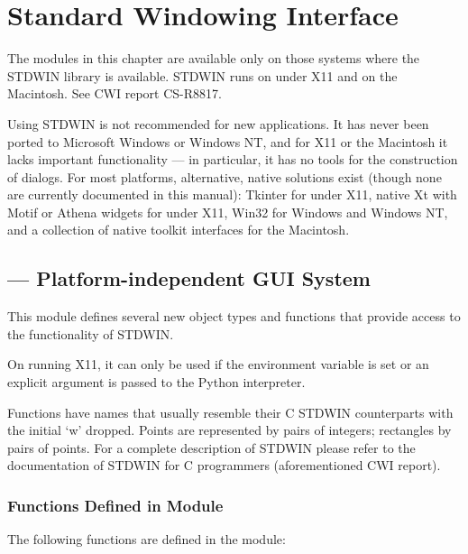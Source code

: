 \chapter{Standard Windowing Interface}

The modules in this chapter are available only on those systems where
the STDWIN library is available.  STDWIN runs on \UNIX{} under X11 and
on the Macintosh.  See CWI report CS-R8817.

 Using STDWIN is not recommended for new
applications.  It has never been ported to Microsoft Windows or
Windows NT, and for X11 or the Macintosh it lacks important
functionality --- in particular, it has no tools for the construction
of dialogs.  For most platforms, alternative, native solutions exist
(though none are currently documented in this manual): Tkinter for
\UNIX{} under X11, native Xt with Motif or Athena widgets for \UNIX{}
under X11, Win32 for Windows and Windows NT, and a collection of
native toolkit interfaces for the Macintosh.

\section{ ---
         Platform-independent GUI System}



This module defines several new object types and functions that
provide access to the functionality of STDWIN.

On \UNIX{} running X11, it can only be used if the 
environment variable is set or an explicit  argument is passed to the Python interpreter.

Functions have names that usually resemble their C STDWIN counterparts
with the initial `w' dropped.
Points are represented by pairs of integers; rectangles
by pairs of points.
For a complete description of STDWIN please refer to the documentation
of STDWIN for C programmers (aforementioned CWI report).

\subsection{Functions Defined in Module }

The following functions are defined in the  module:

